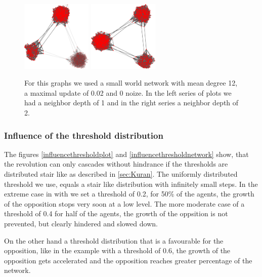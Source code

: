 \begin{figure}
\includegraphics[width=0.3\textwidth]{batchRun__kHalf=6-6-6_maxUpdate=0.02_noize=0_nbrDepth=1/network1000-crop.pdf}
\hskip2cm
\includegraphics[width=0.3\textwidth]{batchRun__kHalf=6-6-6_maxUpdate=0.02_noize=0_nbrDepth=2/network1000-crop.pdf}

\caption{For this graphs we used a small world network with mean degree 12, a maximal update of 0.02 and 0 noize. In the left series of plots we had a neighbor depth of 1 and in the right series a neighbor depth of 2.}
\label{influencenbrdepth}
\end{figure}

\subsubsection{Influence of the threshold distribution}
\label{sec:influencethresholddistribution}

The figures \ref{influencethresholdplot} and \ref{influencethresholdnetwork}
show, that the revolution can only cascades without hindrance if the thresholds
are distributed stair like as described in \ref{sec:Kuran}. The uniformly
distributed threshold we use, equals a stair like distribution with infinitely
small steps. In the extreme case in with we set a threshold of 0.2, for 50\% of
the agents, the growth of the opposition stops very soon at a low level. The
more moderate case of a threshold of 0.4 for half of the agents, the growth of
the oppsition is not prevented, but clearly hindered and slowed down.

On the other hand a threshold distribution that is a favourable for the
opposition, like in the example with a threshold of 0.6, the growth of the
opposition gets accelerated and the opposition reaches greater percentage of
the network.


